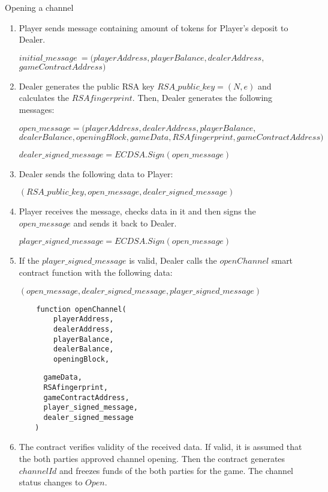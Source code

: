 \begin{algorithm}
\caption{Opening a channel} \label{alg:openchannel}
\begin{enumerate}
	\item Player sends message containing amount of tokens for Player's deposit to Dealer.
\begin{center}
	 $initial\_message\ = (playerAddress, playerBalance, dealerAddress,$\\$ gameContractAddress)$
\end{center}
	\item Dealer generates the public RSA key $RSA\_public\_key= (N,e)$ and calculates the $RSAfingerprint$. Then, Dealer generates the following messages:
\begin{center}
	 $open\_message = (playerAddress,  dealerAddress, playerBalance, $\\$dealerBalance, openingBlock, gameData, RSAfingerprint, gameContractAddress)$

	$dealer\_signed\_message = ECDSA.Sign(open\_message)$
\end{center}
	\item Dealer sends the following data to Player:
\begin{center}
$(RSA\_public\_key, open\_message,dealer\_signed\_message)$
\end{center}
	\item Player receives the message, checks data in it and then signs the $open\_message$ and sends it back to Dealer.
\begin{center}
	$player\_signed\_message = ECDSA.Sign(open\_message)$
\end{center}
\item If the $player\_signed\_message$ is valid, Dealer calls the $openChannel$ smart contract function with the following data:
\begin{center}
$(open\_message,dealer\_signed\_message,player\_signed\_message)$
\end{center}	
\begin{lstlisting}
    function openChannel(
        playerAddress,
        dealerAddress,
        playerBalance,
        dealerBalance,
        openingBlock,
\end{lstlisting}
\end{enumerate}
\end{algorithm}
\begin{algorithm}
\begin{lstlisting}
	     gameData,
	     RSAfingerprint,
	     gameContractAddress,
	     player_signed_message,
 	     dealer_signed_message
 	   )
\end{lstlisting}
\begin{enumerate}
\setcounter{enumi}{5}
\item The contract verifies validity of the received data. If valid, it is assumed that the both parties approved channel opening. Then the contract generates $channelId$ and freezes funds of the both parties for the game. The channel status changes to $Open$. 
\end{enumerate}
\end{algorithm}

